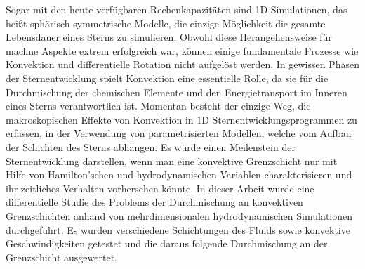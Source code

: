 Sogar mit den heute verfügbaren Rechenkapazitäten sind 1D Simulationen, das heißt sphärisch symmetrische Modelle, die einzige Möglichkeit die gesamte Lebensdauer eines Sterns zu simulieren. Obwohl diese Herangehensweise für machne Aspekte extrem erfolgreich war, können einige fundamentale Prozesse wie Konvektion und differentielle Rotation nicht aufgelöst werden. In gewissen Phasen der Sternentwicklung spielt Konvektion eine essentielle Rolle, da sie für die Durchmischung der chemischen Elemente und den Energietransport im Inneren eines Sterns verantwortlich ist. Momentan besteht der einzige Weg, die makroskopischen Effekte von Konvektion in 1D Sternentwicklungsprogrammen zu erfassen, in der Verwendung von parametrisierten Modellen, welche vom Aufbau der Schichten des Sterns abhängen. Es würde einen Meilenstein der Sternentwicklung darstellen, wenn man eine konvektive Grenzschicht nur mit Hilfe von Hamilton'schen und hydrodynamischen Variablen charakterisieren und ihr zeitliches Verhalten vorhersehen könnte. In dieser Arbeit wurde eine differentielle Studie des Problems der Durchmischung an konvektiven Grenzschichten anhand von mehrdimensionalen hydrodynamischen Simulationen durchgeführt. Es wurden verschiedene Schichtungen des Fluids sowie konvektive Geschwindigkeiten getestet und die daraus folgende Durchmischung an der Grenzschicht ausgewertet.
